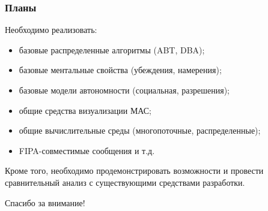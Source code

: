 \documentclass{beamer}
\begin{document}
\begin{frame}
  \frametitle{Планы}
  Необходимо реализовать:
  \begin{itemize}
    \item базовые распределенные алгоритмы (ABT, DBA);
    \item базовые ментальные свойства (убеждения, намерения);
    \item базовые модели автономности (социальная, разрешения);
    \item общие средства визуализации МАС;
    \item общие вычислительные среды (многопоточные, распределенные);
    \item FIPA-совместимые сообщения и т.д.
  \end{itemize}

  Кроме того, необходимо продемонстрировать возможности и провести сравнительный анализ
  с существующими средствами разработки.
\end{frame}

\begin{frame}{}
\addtocounter{framenumber}{-1}
\begin{center}
\LARGE{Спасибо за внимание!}
\end{center}
\end{frame}
\end{document}
